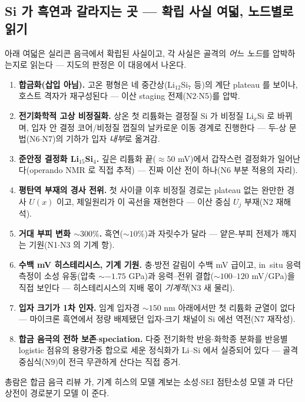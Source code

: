 \subsection{Si 가 흑연과 갈라지는 곳 --- 확립 사실 여덟, 노드별로 읽기}\label{ssec:si-stress}
아래 여덟은 실리콘 음극에서 확립된 사실이고, 각 사실은 골격의 \emph{어느 노드}를 압박하는지로 읽는다
--- 지도의 판정은 이 대응에서 나온다.

\begin{enumerate}[label=(\roman*),leftmargin=2.2em,itemsep=1.5pt]
\item \textbf{합금화(삽입 아님).} 고온 평형은 네 중간상(Li$_{12}$Si$_7$ 등)의 계단 plateau 를
보이나\cite{wen_huggins1981}, 호스트 격자가 재구성된다 --- 이산 staging 전제(N2$\cdot$N5)를 압박.
\item \textbf{전기화학적 고상 비정질화.} 상온 첫 리튬화는 결정질 Si 가 비정질 Li$_x$Si 로 바뀌며,
입자 안 결정 코어/비정질 껍질의 날카로운 이동 경계로 진행한다\cite{limthongkul2003,li_dahn2007} ---
두-상 문법(N6$\cdot$N7)의 기하가 입자 \emph{내부}로 옮겨감.
\item \textbf{준안정 결정화 Li$_{15}$Si$_4$.} 깊은 리튬화 끝($\approx50$ mV)에서 갑작스런 결정화가
일어난다\cite{obrovac_christensen2004}(operando NMR 로 직접 추적\cite{ogata_nmr2014}) --- 진짜 이산
전이 하나(N6 부분 적용의 자리).
\item \textbf{평탄역 부재의 경사 전위.} 첫 사이클 이후 비정질 경로는 plateau 없는 완만한 경사 $U(x)$ 이고,
제일원리가 이 곡선을 재현한다\cite{chevrier_dahn2009} --- 이산 중심 $U_j$ 부재(N2 재해석).
\item \textbf{거대 부피 변화 $\sim300\%$.}\cite{beaulieu2001} 흑연($\sim10\%$)과 자릿수가 달라 ---
얕은-부피 전제가 깨지는 기원(N1$\cdot$N3 의 기계 항).
\item \textbf{수백 mV 히스테리시스, 기계 기원.} 충$\cdot$방전 갈림이 수백 mV 급이고, in~situ 응력 측정이
소성 유동(압축 $\sim-1.75$ GPa)과 응력--전위 결합($\sim100$--$120$ mV/GPa)을 직접
보인다\cite{sethuraman_stressevo2010,sethuraman_stresspot2010} --- 히스테리시스의 지배 몫이
\emph{기계적}(N3 새 물리).
\item \textbf{입자 크기가 1차 인자.} 임계 입자경 $\sim150$ nm 아래에서만 첫 리튬화 균열이
없다\cite{liu_sizefracture2012} --- 마이크론 흑연에서 정량 배제됐던 입자-크기 채널이 Si 에선 역전(N7 재작성).
\item \textbf{합금 음극의 전하 보존$\cdot$speciation.} 다중 전기화학 반응$\cdot$화학종 분화를 반응별
logistic 점유의 용량가중 합으로 세운 정식화가 Li--Si 에서 실증되어
있다\cite{verbrugge_lisi2016} --- 골격 중심식(N9)이 전극 무관하게 산다는 직접 증거.
\end{enumerate}
총람은 합금 음극 리뷰\cite{obrovac_chevrier2014} 가, 기계 히스의 모델 계보는 소성$\cdot$SEI 점탄소성
모델\cite{koebbing2024} 과 다단 상전이 경로분기 모델\cite{jiang_sihys2020} 이 준다.

